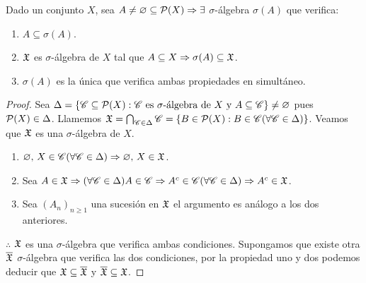 \begin{prop}
    Dado un conjunto \(X\), sea \(A \neq \varnothing \subseteq \mathcal{P}(X) \Rightarrow \exists\) \(\sigma\)-álgebra \(\sigma(A)\) que verifica: \begin{enumerate}
        \item \(A \subseteq \sigma(A)\).
        \item \(\mathfrak{X}\) es \(\sigma\)-álgebra de \(X\) tal que \(A \subseteq X \Rightarrow \sigma(A) \subseteq \mathfrak{X}\).
        \item \(\sigma(A)\) es la única que verifica ambas propiedades en simultáneo.
    \end{enumerate}

    \begin{proof}
        Sea \(\Delta = \{ \mathscr{C} \subseteq \mathcal{P}(X) : \mathscr{C} \text{ es } \sigma \text{-álgebra de } X \text{ y } A \subseteq \mathscr{C} \} \neq \varnothing\) pues \(\mathcal{P}(X) \in \Delta\).
        Llamemos \(\mathfrak{X} = \bigcap_{\mathscr{C} \in \Delta} \mathscr{C} = \{ B \in \mathcal{P}(X) : B \in \mathscr{C} (\forall \mathscr{C} \in \Delta) \}\).
        Veamos que \(\mathfrak{X}\) es una \(\sigma\)-álgebra de \(X\).
        \begin{enumerate}
            \item \(\varnothing\text{, } X \in \mathscr{C} (\forall \mathscr{C} \in \Delta) \Rightarrow \varnothing\text{, } X \in \mathfrak{X}\).
            \item Sea \(A \in \mathfrak{X} \Rightarrow (\forall \mathscr{C} \in \Delta) A \in \mathscr{C} \Rightarrow A^c \in \mathscr{C} (\forall \mathscr{C} \in \Delta) \Rightarrow A^c \in \mathfrak{X}\).
            \item Sea \((A_n)_{n \geq 1}\) una sucesión en \(\mathfrak{X}\) el argumento es análogo a los dos anteriores.
        \end{enumerate}
        \(\therefore\) \(\mathfrak{X}\) es una \(\sigma\)-álgebra que verifica ambas condiciones.
        Supongamos que existe otra \(\overline{\mathfrak{X}}\) \(\sigma\)-álgebra que verifica las dos condiciones, por la propiedad uno y dos podemos deducir que \(\mathfrak{X} \subseteq \overline{\mathfrak{X}}\) y \(\overline{\mathfrak{X}} \subseteq \mathfrak{X}\).
    \end{proof}
\end{prop}

